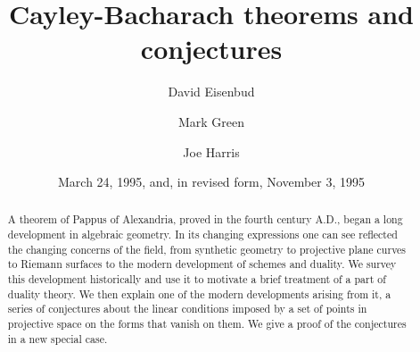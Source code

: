 \documentclass{bull-l}
\theoremstyle{pplain}
\theoremstyle{definition}
\begin{document}
\title{Cayley-Bacharach theorems and conjectures}
\author[D. Eisenbud]{David Eisenbud}
\address {Department of Mathematics, Brandeis University, Waltham, Massachusetts
02254-9110} 
\author[M. Green]{Mark Green}
\address{Department of Mathematics, University of California, Los Angeles, Los
Angeles, California 90095-1555}
\author[J. Harris]{Joe Harris}
\address{Department of Mathematics, Harvard University, Cambridge,
Massachusetts 02138-2901}
\date{March 24, 1995, and, in revised form, November 3, 1995}
\begin{abstract}
A theorem of Pappus of Alexandria, proved in the fourth century A.D., began a
long development in algebraic geometry.  In its changing expressions one can
see reflected the changing concerns of the field, from synthetic geometry to
projective plane curves to Riemann surfaces to the modern development of
schemes and duality.  We survey this development historically and use it to
motivate a brief treatment of a part of duality theory.  We then explain one of
the modern developments arising from it, a series of conjectures about the 
linear conditions imposed by a set of points in projective space on the forms
that vanish on them. We give a proof of the conjectures in a new special case.
\end{abstract}

\maketitle

\tableofcontents
\end{document}
